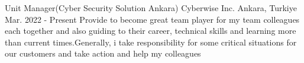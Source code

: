 
\begin{cventries}
  \cventry
    {Unit Manager(Cyber Security Solution Ankara)} %
    {Cyberwise Inc.} %
    {Ankara, Turkiye} %
    {Mar. 2022 - Present} %
    {Provide to become great team player for my team colleagues each together and also guiding to their career, technical skills and learning more than current times.Generally, i take responsibility for some critical situations for our customers and take action and help my colleagues}%
    {
      \begin{cvitems} %
      \end{cvitems}
    }


\end{cventries}
